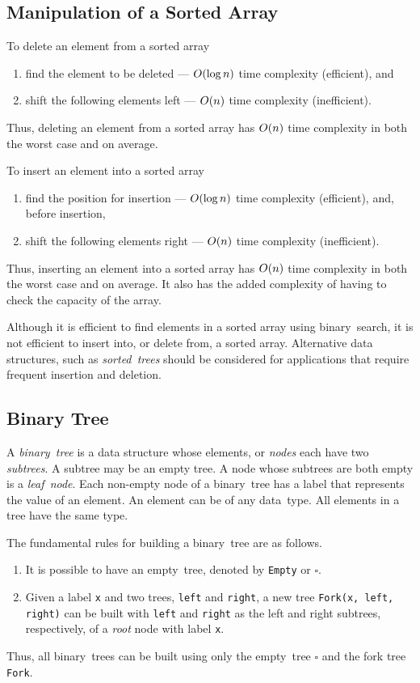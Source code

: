 \subsection{Manipulation of a Sorted Array}

To delete an element from a sorted array
\begin{enumerate}
  \item find the element to be deleted --- \( O\!\left(\log n\right) \) time complexity (efficient), and
  \item shift the following elements left --- \( O\!\left(n\right) \) time complexity (inefficient).
\end{enumerate}
Thus, deleting an element from a sorted array has \( O\!\left(n\right) \) time complexity in both the worst case and on average.

To insert an element into a sorted array
\begin{enumerate}
  \item find the position for insertion --- \( O\!\left(\log n\right) \) time complexity (efficient), and, before insertion,
  \item shift the following elements right --- \( O\!\left(n\right) \) time complexity (inefficient).
\end{enumerate}
Thus, inserting an element into a sorted array has \( O\!\left(n\right) \) time complexity in both the worst case and on average.
It also has the added complexity of having to check the capacity of the array.

Although it is efficient to find elements in a sorted array using binary~search, it is not efficient to insert into, or delete from, a sorted array.
Alternative data structures, such as \emph{sorted~trees} should be considered for applications that require frequent insertion and deletion.

\subsection{Binary Tree}

A \emph{binary~tree} is a data structure whose elements, or \emph{nodes} each have two \emph{subtrees}.
A subtree may be an empty tree.
A node whose subtrees are both empty is a \emph{leaf~node}.
Each non-empty node of a binary~tree has a label that represents the value of an element.
An element can be of any data~type.
All elements in a tree have the same type.

The fundamental rules for building a binary~tree are as follows.
\begin{enumerate}
  \item It is possible to have an empty~tree, denoted by \texttt{Empty} or \( \square \).
  \item Given a label \texttt{x} and two trees, \texttt{left} and \texttt{right}, a new tree \texttt{Fork(x, left, right)} can be built with \texttt{left} and \texttt{right} as the left and right subtrees, respectively, of a \emph{root} node with label \texttt{x}.
\end{enumerate}
Thus, all binary~trees can be built using only the empty~tree \( \square \) and the fork tree \texttt{Fork}.

